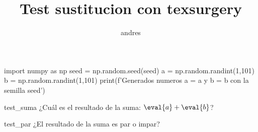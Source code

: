 \documentclass[a4paper]{article}
\title{Test sustitucion con texsurgery}
\author{andres}
\begin{document}
\begin{run}
    import numpy as np
    seed = \seed
    np.random.seed(seed)
    a = np.random.randint(1,101)
    b = np.random.randint(1,101)
    print(f'Generados numeros a = {a} y b = {b} con la semilla {seed}')
\end{run} \newline \newline

\begin{question}{test_suma}
    ¿Cuál es el resultado de la suma: $\eval{a} + \eval{b}$?
    \begin{choices}
    \end{choices}
\end{question}


\begin{question}{test_par}
    ¿El resultado de la suma es par o impar?
    \begin{choices}
    \end{choices}
\end{question}
\end{document}

